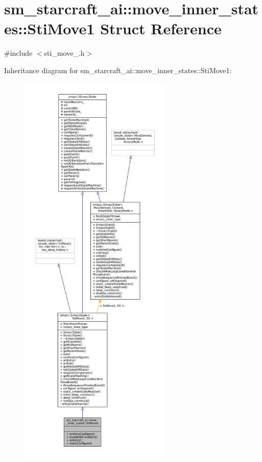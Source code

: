 \hypertarget{structsm__starcraft__ai_1_1move__inner__states_1_1StiMove1}{}\section{sm\+\_\+starcraft\+\_\+ai\+:\+:move\+\_\+inner\+\_\+states\+:\+:Sti\+Move1 Struct Reference}
\label{structsm__starcraft__ai_1_1move__inner__states_1_1StiMove1}


{\ttfamily \#include $<$sti\+\_\+move\+\_.\+h$>$}



Inheritance diagram for sm\+\_\+starcraft\+\_\+ai\+:\+:move\+\_\+inner\+\_\+states\+:\+:Sti\+Move1\+:
\nopagebreak
\begin{figure}[H]
\begin{center}
\leavevmode
\includegraphics[height=550pt]{structsm__starcraft__ai_1_1move__inner__states_1_1StiMove1__inherit__graph}
\end{center}
\end{figure}


